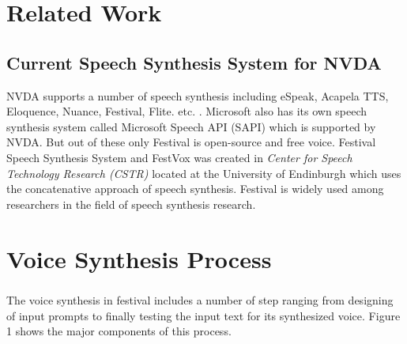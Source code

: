 \documentclass{report}
\begin{document}
	\chapter{Related Work}
		\section{Current Speech Synthesis System for NVDA}
			NVDA supports a number of speech synthesis including eSpeak, Acapela TTS, Eloquence, Nuance, Festival, Flite. etc. \cite{NVDA:7}. Microsoft also has its own speech synthesis system called Microsoft Speech API (SAPI) which is supported by NVDA. But out of these only Festival is open-source and free voice. Festival Speech Synthesis System and FestVox was created in \textit{Center for Speech Technology Research (CSTR)} located at the University of Endinburgh which uses the concatenative approach of speech synthesis. Festival is widely used among researchers in the field of speech synthesis research. \cite{FESTVOICE:8}
	\chapter{Voice Synthesis Process}
		\paragraph{}
			The voice synthesis in festival includes a number of step ranging from designing of input prompts to finally testing the input text for its synthesized voice. Figure 1 shows the major components of this process.
\end{document}
